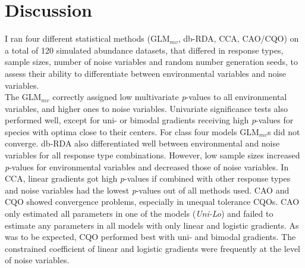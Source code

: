 
\section{Discussion}


	I ran four different statistical methods (GLM$_{mv}$, db-RDA, CCA, CAO/CQO) on a total of 120 simulated abundance datasets, that differed in response types, sample sizes, number of noise variables and random number generation seeds, to assess their ability to differentiate between environmental variables and noise variables. \\


	The GLM$_{mv}$ correctly assigned low multivariate \textit{p}-values to all environmental variables, and higher ones to noise variables.
	Univariate significance tests also performed well, except for uni- or bimodal gradients receiving high \textit{p}-values for species with optima close to their centers.   
	For class four models GLM$_{mv}$s did not converge.
	db-RDA also differentiated well between environmental and noise variables for all response type combinations.
	However, low sample sizes increased \textit{p}-values for environmental variables and decreased those of noise variables.
	In CCA, linear gradients got high \textit{p}-values if combined with other response types and noise variables had the lowest \textit{p}-values out of all methods used. 
	CAO and CQO showed convergence problems, especially in unequal tolerance CQOs. 
	CAO only estimated all parameters in one of the models (\textit{Uni-Lo}) and failed to estimate any parameters in all models with only linear and logistic gradients.
	As was to be expected, CQO performed best with uni- and bimodal gradients. 
	The constrained coefficient of linear and logistic gradients were frequently  at the level of noise variables.\\




